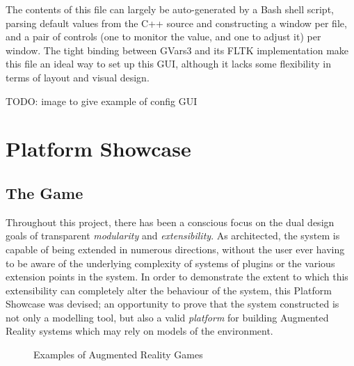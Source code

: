 \documentclass[a4paper,10pt]{article}
\begin{document}
The contents of this file can largely be auto-generated by a Bash shell script, parsing default values from the C++ source and constructing a window per file, and a pair of controls (one to monitor the value, and one to adjust it) per window. The tight binding between GVars3 and its FLTK implementation make this file an ideal way to set up this GUI, although it lacks some flexibility in terms of layout and visual design.

TODO: image to give example of config GUI

\section{Platform Showcase}
\subsection{The Game}
Throughout this project, there has been a conscious focus on the dual design goals of transparent \textit{modularity} and \textit{extensibility}. As architected, the system is capable of being extended in numerous directions, without the user ever having to be aware of the underlying complexity of systems of plugins or the various extension points in the system. In order to demonstrate the extent to which this extensibility can completely alter the behaviour of the system, this Platform Showcase was devised; an opportunity to prove that the system constructed is not only a modelling tool, but also a valid \textit{platform} for building Augmented Reality systems which may rely on models of the environment.

\begin{figure}[t]
    \quad
    \caption{Examples of Augmented Reality Games}
\end{figure}
\end{document}

